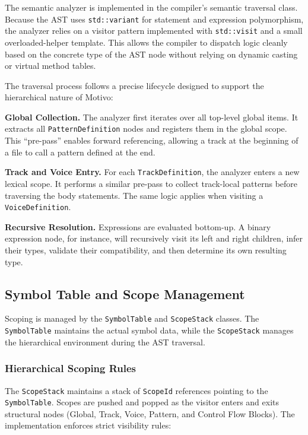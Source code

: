 The semantic analyzer is implemented in the compiler's semantic traversal class.
Because the AST uses \texttt{std::variant} for statement and expression polymorphism, the analyzer relies on a visitor
pattern implemented with \texttt{std::visit} and a small overloaded-helper template.
This allows the compiler to dispatch logic cleanly based on the concrete type of the AST node without relying on dynamic
casting or virtual method tables.

The traversal process follows a precise lifecycle designed to support the hierarchical nature of Motivo\@:

\noindent \textbf{Global Collection.} The analyzer first iterates over all top-level global items.
It extracts all \texttt{PatternDefinition} nodes and registers them in the global scope.
This ``pre-pass'' enables forward referencing, allowing a track at the beginning of a file to call a pattern defined
at the end.

\noindent \textbf{Track and Voice Entry.} For each \texttt{TrackDefinition}, the analyzer enters a new lexical scope.
It performs a similar pre-pass to collect track-local patterns before traversing the body statements.
The same logic applies when visiting a \texttt{VoiceDefinition}.

\noindent \textbf{Recursive Resolution.} Expressions are evaluated bottom-up.
A binary expression node, for instance, will recursively visit its left and right children, infer their types,
validate their compatibility, and then determine its own resulting type.

\subsection{Symbol Table and Scope Management}\label{detail-subsec:symbol-table-and-scope-management}

Scoping is managed by the \texttt{SymbolTable} and \texttt{ScopeStack} classes.
The \texttt{SymbolTable} maintains the actual symbol data, while the \texttt{ScopeStack} manages the hierarchical
environment during the AST traversal.

\subsubsection{Hierarchical Scoping Rules}

The \texttt{ScopeStack} maintains a stack of \texttt{ScopeId} references pointing to the \texttt{SymbolTable}.
Scopes are pushed and popped as the visitor enters and exits structural nodes (Global, Track, Voice, Pattern, and
Control Flow Blocks).
The implementation enforces strict visibility rules:

